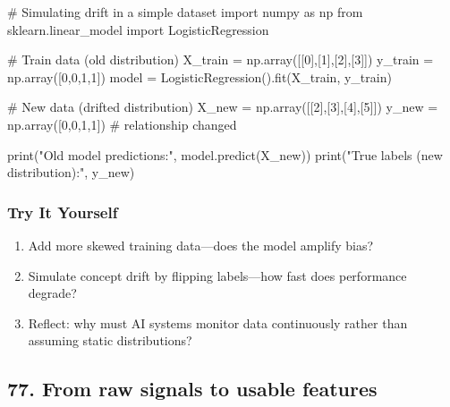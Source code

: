 \documentclass[
  letterpaper,
  DIV=11,
  numbers=noendperiod]{scrreprt}
\newenvironment{Shaded}{\begin{snugshade}}{\end{snugshade}}
\newcommand{\BuiltInTok}[1]{\textcolor[rgb]{0.00,0.23,0.31}{#1}}
\newcommand{\CommentTok}[1]{\textcolor[rgb]{0.37,0.37,0.37}{#1}}
\newcommand{\DecValTok}[1]{\textcolor[rgb]{0.68,0.00,0.00}{#1}}
\newcommand{\ImportTok}[1]{\textcolor[rgb]{0.00,0.46,0.62}{#1}}
\newcommand{\NormalTok}[1]{\textcolor[rgb]{0.00,0.23,0.31}{#1}}
\newcommand{\OperatorTok}[1]{\textcolor[rgb]{0.37,0.37,0.37}{#1}}
\newcommand{\StringTok}[1]{\textcolor[rgb]{0.13,0.47,0.30}{#1}}
\providecommand{\tightlist}{%
  \setlength{\itemsep}{0pt}\setlength{\parskip}{0pt}}
\begin{document}
\begin{Shaded}
\begin{Highlighting}[]
\CommentTok{\# Simulating drift in a simple dataset}
\ImportTok{import}\NormalTok{ numpy }\ImportTok{as}\NormalTok{ np}
\ImportTok{from}\NormalTok{ sklearn.linear\_model }\ImportTok{import}\NormalTok{ LogisticRegression}

\CommentTok{\# Train data (old distribution)}
\NormalTok{X\_train }\OperatorTok{=}\NormalTok{ np.array([[}\DecValTok{0}\NormalTok{],[}\DecValTok{1}\NormalTok{],[}\DecValTok{2}\NormalTok{],[}\DecValTok{3}\NormalTok{]])}
\NormalTok{y\_train }\OperatorTok{=}\NormalTok{ np.array([}\DecValTok{0}\NormalTok{,}\DecValTok{0}\NormalTok{,}\DecValTok{1}\NormalTok{,}\DecValTok{1}\NormalTok{])}
\NormalTok{model }\OperatorTok{=}\NormalTok{ LogisticRegression().fit(X\_train, y\_train)}

\CommentTok{\# New data (drifted distribution)}
\NormalTok{X\_new }\OperatorTok{=}\NormalTok{ np.array([[}\DecValTok{2}\NormalTok{],[}\DecValTok{3}\NormalTok{],[}\DecValTok{4}\NormalTok{],[}\DecValTok{5}\NormalTok{]])}
\NormalTok{y\_new }\OperatorTok{=}\NormalTok{ np.array([}\DecValTok{0}\NormalTok{,}\DecValTok{0}\NormalTok{,}\DecValTok{1}\NormalTok{,}\DecValTok{1}\NormalTok{])  }\CommentTok{\# relationship changed}

\BuiltInTok{print}\NormalTok{(}\StringTok{"Old model predictions:"}\NormalTok{, model.predict(X\_new))}
\BuiltInTok{print}\NormalTok{(}\StringTok{"True labels (new distribution):"}\NormalTok{, y\_new)}
\end{Highlighting}
\end{Shaded}

\subsubsection{Try It Yourself}\label{try-it-yourself-75}

\begin{enumerate}
\def\labelenumi{\arabic{enumi}.}
\tightlist
\item
  Add more skewed training data---does the model amplify bias?
\item
  Simulate concept drift by flipping labels---how fast does performance
  degrade?
\item
  Reflect: why must AI systems monitor data continuously rather than
  assuming static distributions?
\end{enumerate}

\subsection{77. From raw signals to usable
features}\label{from-raw-signals-to-usable-features}
\end{document}
